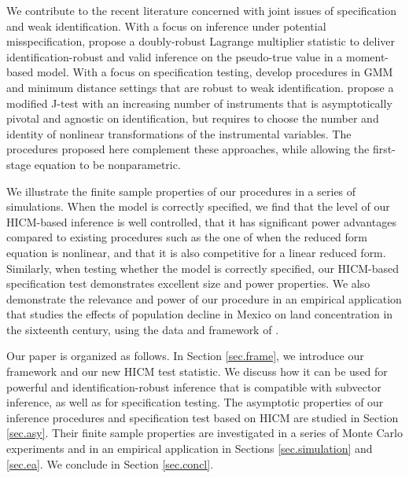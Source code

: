 \documentclass[12pt]{article}
\newcommand{\1}{\mathbf{1}}
\begin{document}
We  contribute to the recent literature  concerned with joint
issues of specification  and weak identification.
With a focus on inference  under potential misspecification,
\cite{KleibergenZhan} propose a
doubly-robust Lagrange multiplier statistic to deliver
identification-robust and valid inference on the pseudo-true value in
a moment-based model.
With a focus on specification testing,
\cite{AntoineFrazierRenault2026WP}  develop procedures
in GMM and minimum distance settings that are robust to weak
identification. \cite{Dovonon2026} propose a  modified J-test with
an increasing number of instruments that is asymptotically pivotal
and agnostic on identification, but requires to choose the number and
identity of nonlinear transformations of the instrumental variables.
The procedures proposed here complement these approaches, while
allowing the first-stage equation to be nonparametric.

We illustrate the finite sample properties of our procedures in a
series of simulations. When the model is correctly specified, we find
that the level of our HICM-based inference is well
controlled, that it has significant power advantages compared to
existing procedures such as the one of \cite{SW} when the reduced form
equation is nonlinear, and that it  is also competitive for a linear
reduced form. Similarly, when testing whether the model is correctly
specified, our HICM-based specification test demonstrates excellent
size and power properties. We also demonstrate the relevance and power
of our procedure in an empirical application that studies the effects
of population decline in Mexico on land concentration in the sixteenth
century, using the data and framework of \cite{Mexico}.

Our paper is organized as follows. In Section \ref{sec.frame}, we
introduce our framework and our new HICM test statistic. We discuss
how it can be used for powerful and identification-robust inference
that is compatible with subvector inference, as well as for
specification testing. The asymptotic properties of our inference
procedures and specification test based on HICM are studied in
Section \ref{sec.asy}. Their finite sample properties are investigated
in a series of Monte Carlo experiments and in an empirical application
in Sections  \ref{sec.simulation} and \ref{sec.ea}. We conclude in Section \ref{sec.concl}.
\end{document}
